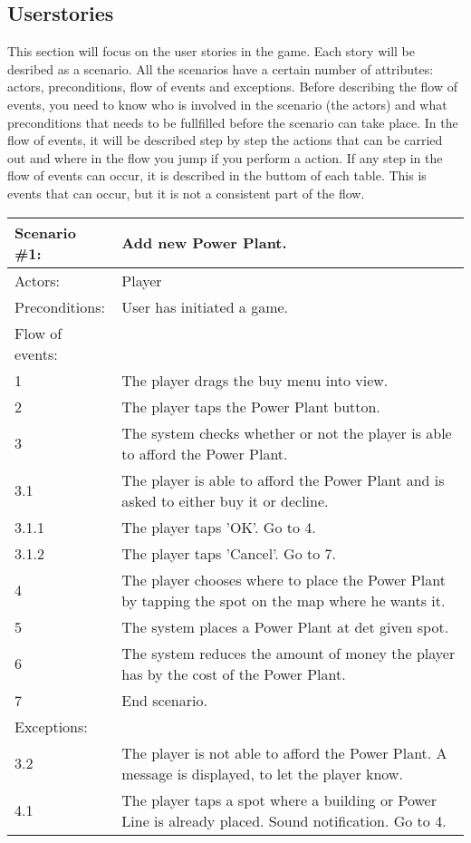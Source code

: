 \subsection{Userstories}

This section will focus on the user stories in the game. Each story will be 
desribed as a scenario. All the scenarios have a certain number of attributes:
actors, preconditions, flow of events and exceptions.
Before describing the flow of events, you need to know who is involved in the 
scenario (the actors) and what preconditions that needs to be fullfilled before
the scenario can take place. 
In the flow of events, it will be described step by step the actions that can be
carried out and where in the flow you jump if you perform a action.
If any step in the flow of events can occur, it is described in the buttom of each
table. This is events that can occur, but it is not a consistent part of the flow. \\


\begin{tabular}{| l | p{10cm} |}
	\hline
	\rowcolor{lightgray}
	{\bf Scenario \#1:} & {\bf Add new Power Plant.} \\ \hline
	Actors: & Player \\ \hline
	Preconditions: & User has initiated a game. \\ \hline
	Flow of events: &  \\ \hline
	1 & The player drags the buy menu into view. \\ \hline
	2 & The player taps the Power Plant button. \\ \hline
	3 & The system checks whether or not the player is able to afford the Power Plant. \\ \hline
	3.1 & The player is able to afford the Power Plant and is asked to either buy it or decline. \\ \hline
	3.1.1 & The player taps 'OK'. Go to 4. \\ \hline
	3.1.2 & The player taps 'Cancel'. Go to 7. \\ \hline
	4 & The player chooses where to place the Power Plant by tapping the spot on the map where he wants it. \\ \hline
	5 & The system places a Power Plant at det given spot. \\ \hline
	6 & The system reduces the amount of money the player has by the cost of the Power Plant. \\ \hline
	7 & End scenario. \\ \hline
	Exceptions: & \\ \hline
	3.2 & The player is not able to afford the Power Plant. A message is displayed, to let the player know. \\ \hline
	4.1 & The player taps a spot where a building or Power Line is already placed. Sound notification. Go to 4. \\ \hline
\end{tabular}

